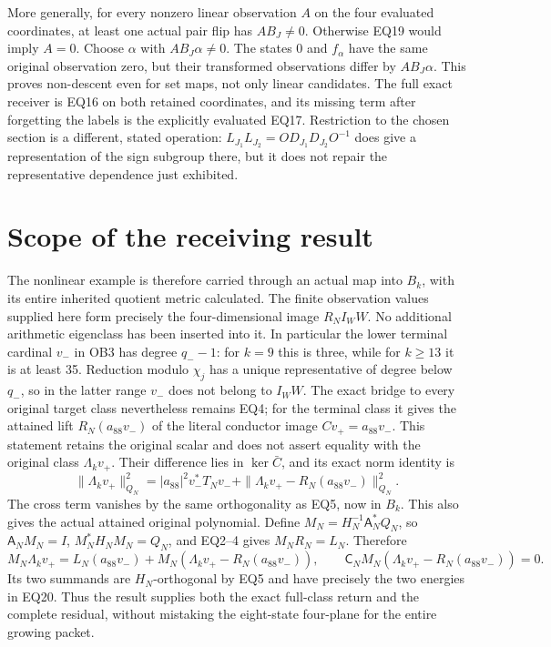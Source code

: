\documentclass[11pt]{article}
\begin{document}
More generally, for every nonzero linear observation $A$ on the
four evaluated coordinates, at least one actual pair flip has
$AB_J\ne0$. Otherwise EQ19 would imply $A=0$. Choose $\alpha$
with $AB_J\alpha\ne0$. The states $0$ and $f_\alpha$ have the same
original observation zero, but their transformed observations differ
by $AB_J\alpha$. This proves non-descent even for set maps, not only
linear candidates. The full exact receiver is EQ16 on both retained
coordinates, and its missing term after forgetting the labels is
the explicitly evaluated EQ17. Restriction to the chosen section
is a different, stated operation: $L_{J_1}L_{J_2}=OD_{J_1}D_{J_2}O^{-1}$
does give a representation of the sign subgroup there, but it does
not repair the representative dependence just exhibited.

\section{Scope of the receiving result}
The nonlinear example is therefore carried through an actual map
into $B_k$, with its entire inherited quotient metric calculated.
The finite observation values supplied here form precisely the
four-dimensional image $R_NI_W W$. No additional arithmetic
eigenclass has been inserted into it. In particular the lower
terminal cardinal $v_-$ in OB3 has degree $q_--1$: for $k=9$ this
is three, while for $k\ge13$ it is at least 35. Reduction modulo
$\chi_j$ has a unique representative of degree below $q_-$, so
in the latter range $v_-$ does not belong to $I_WW$. The exact
bridge to every original target class nevertheless remains EQ4;
for the terminal class it gives the attained lift
$R_N(a_{88}v_-)$ of the literal conductor image
$Cv_+=a_{88}v_-$. This statement retains the original scalar and
does not assert equality with the original class $\Lambda_kv_+$.
Their difference lies in $\ker\bar C$, and its exact norm identity is
\[
 \|\Lambda_kv_+\|_{Q_N}^2
 =|a_{88}|^2v_-^*T_Nv_-
   +\|\Lambda_kv_+-R_N(a_{88}v_-)\|_{Q_N}^2.                        \tag{EQ20}
\]
The cross term vanishes by the same orthogonality as EQ5, now in
$B_k$. This also gives the actual attained original polynomial.
Define $M_N=H_N^{-1}\mathsf A_N^*Q_N$, so
$\mathsf A_NM_N=I$, $M_N^*H_NM_N=Q_N$, and EQ2--4 gives
$M_NR_N=L_N$. Therefore
\[
 M_N\Lambda_kv_+
 =L_N(a_{88}v_-)+M_N(\Lambda_kv_+-R_N(a_{88}v_-)),\qquad
 \mathsf C_NM_N(\Lambda_kv_+-R_N(a_{88}v_-))=0.                       \tag{EQ21}
\]
Its two summands are $H_N$-orthogonal by EQ5 and have precisely
the two energies in EQ20. Thus the result supplies both the exact
full-class return and the complete residual, without mistaking the
eight-state four-plane for the entire growing packet.
\end{document}
